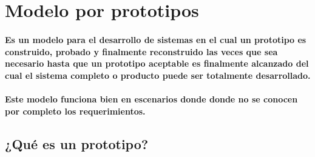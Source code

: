 \section{Modelo por prototipos}
  \paragraph{Es un modelo para el desarrollo de sistemas en el cual un prototipo es construido, probado y finalmente reconstruido las veces que sea necesario hasta que un prototipo aceptable es finalmente alcanzado del cual el sistema completo o producto puede ser totalmente desarrollado.}

  \paragraph{Este modelo funciona bien en escenarios donde donde no se conocen por completo los requerimientos.}

\subsection{¿Qué es un prototipo?}
